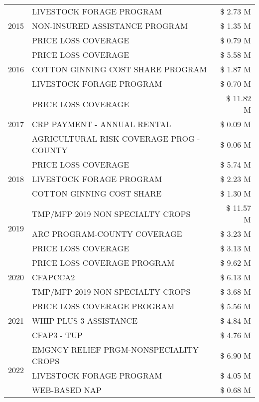 \begin{tabular}{llr}
\cline{1-3}
\multirow[t]{3}{*}{2015} & LIVESTOCK FORAGE PROGRAM & \$ 2.73 M \\
 & NON-INSURED ASSISTANCE PROGRAM & \$ 1.35 M \\
 & PRICE LOSS COVERAGE & \$ 0.79 M \\
\cline{1-3}
\multirow[t]{3}{*}{2016} & PRICE LOSS COVERAGE & \$ 5.58 M \\
 & COTTON GINNING COST SHARE PROGRAM & \$ 1.87 M \\
 & LIVESTOCK FORAGE PROGRAM & \$ 0.70 M \\
\cline{1-3}
\multirow[t]{3}{*}{2017} & PRICE LOSS COVERAGE & \$ 11.82 M \\
 & CRP PAYMENT - ANNUAL RENTAL & \$ 0.09 M \\
 & AGRICULTURAL RISK COVERAGE PROG - COUNTY & \$ 0.06 M \\
\cline{1-3}
\multirow[t]{3}{*}{2018} & PRICE LOSS COVERAGE & \$ 5.74 M \\
 & LIVESTOCK FORAGE PROGRAM & \$ 2.23 M \\
 & COTTON GINNING COST SHARE & \$ 1.30 M \\
\cline{1-3}
\multirow[t]{3}{*}{2019} & TMP/MFP 2019 NON SPECIALTY CROPS & \$ 11.57 M \\
 & ARC PROGRAM-COUNTY COVERAGE & \$ 3.23 M \\
 & PRICE LOSS COVERAGE & \$ 3.13 M \\
\cline{1-3}
\multirow[t]{3}{*}{2020} & PRICE LOSS COVERAGE PROGRAM & \$ 9.62 M \\
 & CFAPCCA2 & \$ 6.13 M \\
 & TMP/MFP 2019 NON SPECIALTY CROPS & \$ 3.68 M \\
\cline{1-3}
\multirow[t]{3}{*}{2021} & PRICE LOSS COVERAGE PROGRAM & \$ 5.56 M \\
 & WHIP PLUS 3 ASSISTANCE & \$ 4.84 M \\
 & CFAP3 - TUP & \$ 4.76 M \\
\cline{1-3}
\multirow[t]{3}{*}{2022} & EMGNCY RELIEF PRGM-NONSPECIALITY CROPS & \$ 6.90 M \\
 & LIVESTOCK FORAGE PROGRAM & \$ 4.05 M \\
 & WEB-BASED NAP & \$ 0.68 M \\
\cline{1-3}
\bottomrule
\end{tabular}
